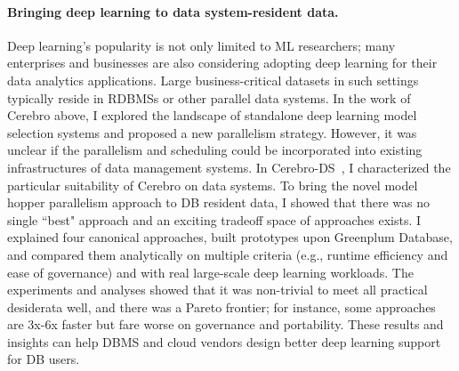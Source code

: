 \documentclass[letterpaper]{article}
\begin{document}
\paragraph{Bringing deep learning to data system-resident data.}
Deep learning's popularity is not only limited to ML researchers; many enterprises and businesses are also considering adopting deep learning for their data analytics applications. Large business-critical
datasets in such settings typically reside in RDBMSs or other parallel data
systems.  In the work of Cerebro above, I explored the landscape of standalone deep learning model selection systems and proposed a new parallelism strategy. However, it was unclear if the parallelism and scheduling could be incorporated into existing infrastructures of data management systems. In Cerebro-DS~\cite{cerebro-ds}, I characterized the particular suitability of Cerebro on data systems. To bring the novel model hopper parallelism approach to DB resident data, I showed that there was no single ``best" approach and
an exciting tradeoff space of approaches exists. I explained four
canonical approaches, built prototypes upon Greenplum Database, and compared them analytically on multiple criteria (e.g., runtime
efficiency and ease of governance) and with real large-scale deep learning workloads. The experiments and analyses showed
that it was non-trivial to meet all practical desiderata well, and there was
a Pareto frontier; for instance, some approaches are 3x-6x faster but
fare worse on governance and portability. These results and insights
can help DBMS and cloud vendors design better deep learning support for DB
users.
\end{document}
